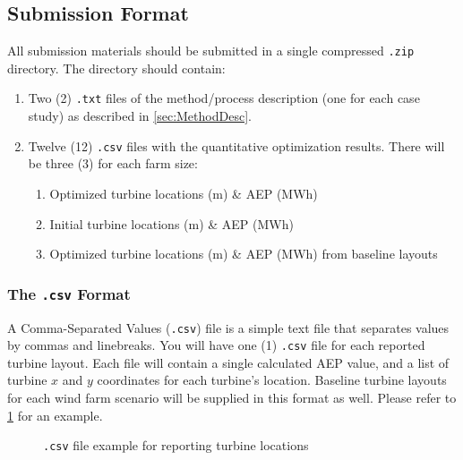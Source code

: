\documentclass[12pt]{article}
\begin{document}
\subsection{Submission Format}
    All submission materials should be submitted in a single compressed \texttt{.zip} directory. The directory should contain:
    
    \begin{enumerate}
        \item Two (2) \texttt{.txt} files of the method/process description (one for each case study) as described in \cref{sec:MethodDesc}.
        \item Twelve (12) \texttt{.csv} files with the quantitative optimization results. There will be three (3) for each farm size:
        \begin{enumerate}[1)]
            \item Optimized turbine locations (m) \& AEP (MWh)
            \item Initial turbine locations (m) \& AEP (MWh)
            \item Optimized turbine locations (m) \& AEP (MWh) from baseline layouts
        \end{enumerate}
    \end{enumerate}
    
    \subsubsection{The \texttt{.csv} Format}
    \label{Sec:Csv}
    A Comma-Separated Values (\texttt{.csv}) file is a simple text file that separates values by commas and linebreaks. You will have one (1) \texttt{.csv} file for each reported turbine layout. Each file will contain a single calculated AEP value, and a list of turbine $x$ and $y$ coordinates for each turbine's location. Baseline turbine layouts for each wind farm scenario will be supplied in this format as well. Please refer to \cref{code:locations} for an example.
    
    \begin{figure}[H]
    \centering
    \caption{\texttt{.csv} file example for reporting turbine locations}
    \label{code:locations}
    \end{figure}
    
\end{document}
